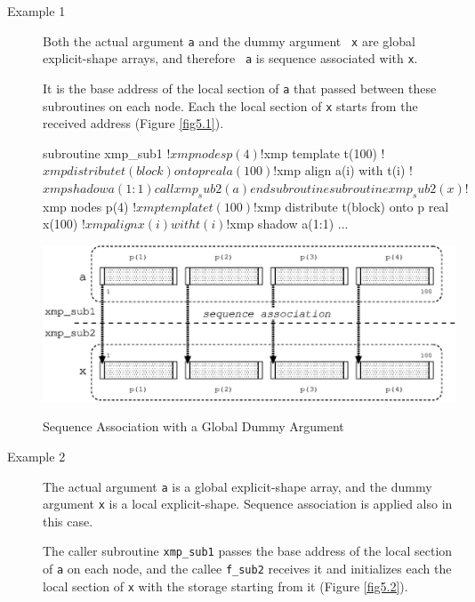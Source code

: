 \begin{description}

\item[Example 1]

	   Both the actual argument {\tt a} and the dummy argument {\tt
	   x} are global explicit-shape arrays, and therefore {\tt
	   a} is sequence associated with {\tt x}.

	   It is the base address of the local section of {\tt a} that
	   passed between these subroutines on each node. Each the local
	   section of {\tt x} starts from the received address (Figure
	   \ref{fig5.1}).

\begin{Fexample}
      subroutine xmp_sub1
!$xmp nodes p(4)
!$xmp template t(100)
!$xmp distribute t(block) onto p
      real a(100)
!$xmp align a(i) with t(i)
!$xmp shadow a(1:1) 
      call xmp_sub2(a)
      end subroutine

      subroutine xmp_sub2(x)
!$xmp nodes p(4)
!$xmp template t(100)
!$xmp distribute t(block) onto p
      real x(100)
!$xmp align x(i) with t(i)
!$xmp shadow a(1:1) 
      ...
\end{Fexample}

\begin{myfigure}
 \includegraphics[scale=0.7]{figs/fig5.1.eps}
 \caption{Sequence Association with a Global Dummy Argument}
 \label{fig5.1}
\end{myfigure}

\item[Example 2]

	   The actual argument {\tt a} is a global explicit-shape array,
	   and the dummy argument {\tt x} is a local explicit-shape. 
	   Sequence association is applied also in this case.

	   The caller subroutine {\tt xmp\_sub1} passes the base address
	   of the local section of {\tt a} on each node, and the callee
	   {\tt f\_sub2} receives it and initializes each the local
	   section of {\tt x} with the storage starting from it (Figure
	   \ref{fig5.2}).


\end{description}
